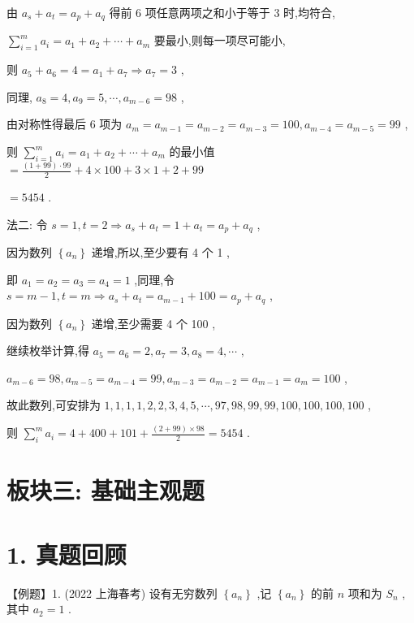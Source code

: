 \documentclass[10pt]{article}
\begin{document}
由 \({a}_{s} + {a}_{t} = {a}_{p} + {a}_{q}\) 得前 6 项任意两项之和小于等于 3 时,均符合,

\(\mathop{\sum }\limits_{{i = 1}}^{m}{a}_{i} = {a}_{1} + {a}_{2} + \cdots  + {a}_{m}\) 要最小,则每一项尽可能小,

则 \({a}_{5} + {a}_{6} = 4 = {a}_{1} + {a}_{7} \Rightarrow  {a}_{7} = 3\) ,

同理, \({a}_{8} = 4,{a}_{9} = 5,\cdots ,{a}_{m - 6} = {98}\) ,

由对称性得最后 6 项为 \({a}_{m} = {a}_{m - 1} = {a}_{m - 2} = {a}_{m - 3} = {100},{a}_{m - 4} = {a}_{m - 5} = {99}\) ,

则 \(\mathop{\sum }\limits_{{i = 1}}^{m}{a}_{i} = {a}_{1} + {a}_{2} + \cdots  + {a}_{m}\) 的最小值 \(= \frac{\left( {1 + {99}}\right)  \cdot  {99}}{2} + 4 \times  {100} + 3 \times  1 + 2 + {99}\)

\(= {5454}\) .

法二: 令 \(s = 1,t = 2 \Rightarrow  {a}_{s} + {a}_{t} = 1 + {a}_{t} = {a}_{p} + {a}_{q}\) ,

因为数列 \(\left\{  {a}_{n}\right\}\) 递增,所以,至少要有 4 个 1 ,

即 \({a}_{1} = {a}_{2} = {a}_{3} = {a}_{4} = 1\) ,同理,令 \(s = m - 1,t = m \Rightarrow  {a}_{s} + {a}_{t} = {a}_{m - 1} + {100} = {a}_{p} + {a}_{q}\) ,

因为数列 \(\left\{  {a}_{n}\right\}\) 递增,至少需要 4 个 100 ,

继续枚举计算,得 \({a}_{5} = {a}_{6} = 2,{a}_{7} = 3,{a}_{8} = 4,\cdots\) ,

\({a}_{m - 6} = {98},{a}_{m - 5} = {a}_{m - 4} = {99},{a}_{m - 3} = {a}_{m - 2} = {a}_{m - 1} = {a}_{m} = {100}\) ,

故此数列,可安排为 \(1,1,1,1,2,2,3,4,5,\cdots ,{97},{98},{99},{99},{100},{100},{100},{100}\) ,

则 \(\mathop{\sum }\limits_{i}^{m}{a}_{i} = 4 + {400} + {101} + \frac{\left( {2 + {99}}\right)  \times  {98}}{2} = {5454}\) .

\section*{板块三: 基础主观题}

\section*{1. 真题回顾}

【例题】1. (2022 上海春考) 设有无穷数列 \(\left\{  {a}_{n}\right\}\) ,记 \(\left\{  {a}_{n}\right\}\) 的前 \(n\) 项和为 \({S}_{n}\) ,其中 \({a}_{2} = 1\) .
\end{document}
